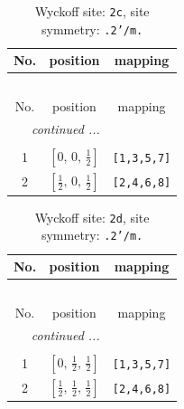 \documentclass[fleqn,8pt]{jsarticle}
\begin{document}
\begin{longtable}{ccc}
\caption{Wyckoff site: {\tt 2c}, site symmetry: {\tt .2'/m.}}
 \\
 \hline \hline
No. & position & mapping \\ \hline \endfirsthead

\multicolumn{2}{l}{\tablename\ \thetable{}} \\
 \hline \hline
No. & position & mapping \\ \hline \endhead

 \hline \hline
\multicolumn{2}{r}{\footnotesize\it continued ...} \\ \endfoot

 \hline \hline
\multicolumn{2}{r}{} \\ \endlastfoot

1 & $\left[ 0,\, 0,\, \frac{1}{2} \right]$ & {\tt [1,3,5,7]} \\ \hline
2 & $\left[ \frac{1}{2},\, 0,\, \frac{1}{2} \right]$ & {\tt [2,4,6,8]} \\
\end{longtable}
\renewcommand{\arraystretch}{1.2}
\begin{longtable}{ccc}
\caption{Wyckoff site: {\tt 2d}, site symmetry: {\tt .2'/m.}}
 \\
 \hline \hline
No. & position & mapping \\ \hline \endfirsthead

\multicolumn{2}{l}{\tablename\ \thetable{}} \\
 \hline \hline
No. & position & mapping \\ \hline \endhead

 \hline \hline
\multicolumn{2}{r}{\footnotesize\it continued ...} \\ \endfoot

 \hline \hline
\multicolumn{2}{r}{} \\ \endlastfoot

1 & $\left[ 0,\, \frac{1}{2},\, \frac{1}{2} \right]$ & {\tt [1,3,5,7]} \\ \hline
2 & $\left[ \frac{1}{2},\, \frac{1}{2},\, \frac{1}{2} \right]$ & {\tt [2,4,6,8]} \\
\end{longtable}
\renewcommand{\arraystretch}{1.2}
\end{document}
